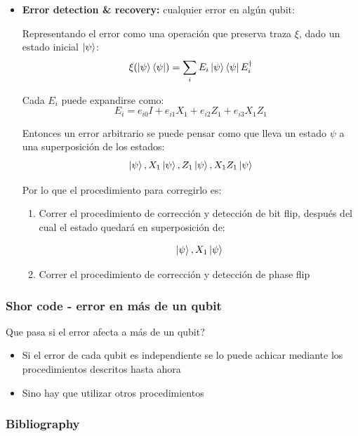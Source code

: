\documentclass[10pt]{beamer}
\theoremstyle{remark}
\theoremstyle{definition}
\begin{document}
\begin{frame}[allowframebreaks]
    \begin{itemize}
        \item \textbf{Error detection \& recovery:} cualquier error en algún qubit:
    
        \vspace{0.2cm}

        Representando el error como una operación que preserva traza $\xi$, dado un estado inicial $\ket{\psi}$:
        \[
            \xi(\ket{\psi}\bra{\psi}) = \sum_i{E_i\ket{\psi}\bra{\psi}E_i^{\dag}}
        \]

        Cada $E_i$ puede expandirse como:
        \[
            E_i = e_{i0}I + e_{i1}X_1 + e_{i2}Z_1 + e_{i3}X_1Z_1
        \]
        
        \framebreak

        Entonces un error arbitrario se puede pensar como que lleva un estado $\psi$ a una superposición de los estados:
        \[
            \ket{\psi}, X_1\ket{\psi}, Z_1\ket{\psi}, X_1Z_1\ket{\psi}
        \]

        Por lo que el procedimiento para corregirlo es:

        \begin{enumerate}
            \item Correr el procedimiento de corrección y detección de bit flip, después del cual el estado quedará en superposición de:
            
            \[
                \ket{\psi}, X_1\ket{\psi}
            \]

            \item Correr el procedimiento de corrección y detección de phase flip
        \end{enumerate}
    \end{itemize}
\end{frame}

\begin{frame}[allowframebreaks]
    \frametitle{Shor code - error en más de un qubit}

    Que pasa si el error afecta a más de un qubit?

    \begin{itemize}
        \item Si el error de cada qubit es independiente se lo puede achicar mediante los procedimientos descritos hasta ahora
        \item Sino hay que utilizar otros procedimientos
    \end{itemize}

\end{frame}

\begin{frame}[allowframebreaks]
    \frametitle{Bibliography}

    \nocite{*}
    \printbibliography
\end{frame}
\end{document}
